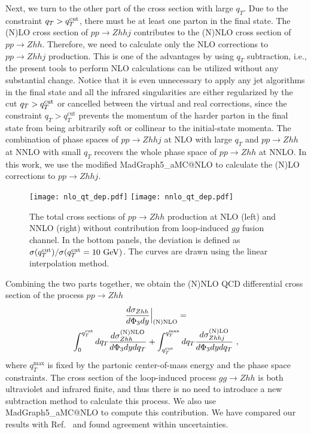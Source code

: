 \documentclass[a4paper,amsmath,preprintnumbers,showpacs,twocolumn,prl,superscriptaddress, nofootinbib]{revtex4}
\newcommand{\cut}{\textrm{cut}}
\begin{document}
 Next, we turn to the other part of the cross section with large $q_T$.
 Due to the constraint  $q_T>q_T^{\rm cut}$, there must be at least one parton in the final state.
 The (N)LO cross section of $pp\to Zhhj$ contributes to the (N)NLO cross section of
 $pp\to Zhh$. 
Therefore, we need to calculate only the NLO corrections to $pp\to Zhhj$ production.
This is one of the advantages by using $q_T$ subtraction, i.e.,
the present tools to perform NLO calculations can be utilized without any substantial change.
Notice that it is even unnecessary to apply any jet algorithms in the final state and all the infrared singularities are either regularized by the cut $q_T>q_T^{\rm cut}$ or cancelled between the virtual and real corrections,
since the constraint $q_T> q_T^{\cut}$ prevents the momentum of the harder parton  in the final state 
from being arbitrarily soft or collinear to the initial-state momenta. 
The combination of phase spaces of $pp \to Zhhj$ at NLO with large $q_T$ and
$pp \to Zhh$ at NNLO with small $q_T$ recovers the whole phase space of $pp\to Zhh$ at NNLO.
In this work, we use the modified MadGraph5\_aMC@NLO \cite{Alwall:2014hca} to 
calculate the (N)LO corrections to $pp \to Zhhj$.


\begin{figure*}
  \texttt{[image: nlo\_qt\_dep.pdf]}
    \texttt{[image: nnlo\_qt\_dep.pdf]}\\
  \caption{The total cross sections of $pp\to Zhh$ production at NLO (left) and NNLO (right) without contribution from loop-induced  $gg$ fusion channel.
    In the bottom panels, the deviation is defined as $\sigma(q_T^{\rm cut})/\sigma(q_T^{\rm cut}=10~{\rm GeV})$.  The curves are drawn  using the linear interpolation method.}
  \label{fig:qTcut}
\end{figure*}



Combining the two parts together, we obtain the (N)NLO  QCD differential cross section of the process $pp\to Zhh$
\begin{multline}\label{eq:main}
   \frac{d\sigma_{Zhh}}{d\Phi_3dy}\Big\vert_{\textrm{(N)NLO}} =
   \\
  \int_0^{q_T^{\cut}} dq_T \frac{d\sigma_{Zhh}^{\rm (N)NLO}}{d\Phi_3 dy dq_T} 
   + \int^{q_T^{\max}}_{q_T^{\cut}} dq_T \frac{d\sigma_{Zhhj}^{\rm (N)LO}}{d\Phi_3dydq_T}~,
\end{multline}
where $q_T^{\max}$ is fixed by the partonic center-of-mass energy and the phase space constraints.
The cross section of the loop-induced process $gg\to Zhh$   is both ultraviolet and infrared finite,
and thus there is no need to introduce a new subtraction method to calculate this process. 
We also use MadGraph5\_aMC@NLO \cite{Alwall:2014hca,Hirschi:2015iia} to compute this contribution.
We have compared our results with Ref.~\cite{Agrawal:2017cbs} and found agreement within uncertainties.
\end{document}
